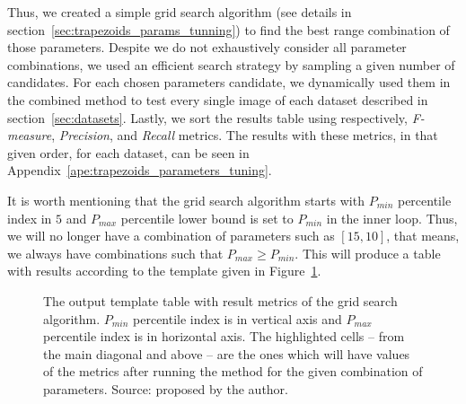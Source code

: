 Thus, we created a simple grid search algorithm (see details in section~\ref{sec:trapezoids_params_tunning}) to find the best range combination of those parameters. Despite we do not exhaustively consider all parameter combinations, we used an efficient search strategy by sampling a given number of candidates. For each chosen parameters candidate, we dynamically used them in the combined method to test every single image of each dataset described in section~\ref{sec:datasets}. Lastly, we sort the results table using respectively, \emph{F-measure}, \emph{Precision}, and \emph{Recall} metrics. The results with these metrics, in that given order, for each dataset, can be seen in Appendix~\ref{ape:trapezoids_parameters_tuning}.

It is worth mentioning that the grid search algorithm starts with $P_{min}$ percentile index in $5$ and $P_{max}$ percentile lower bound is set to $P_{min}$ in the inner loop. Thus, we will no longer have a combination of parameters such as $[15, 10]$, that means, we always have combinations such that $P_{max} \geq P_{min}$. This will produce a table with results according to the template given in Figure~\ref{fig:gs_table_output}.

\begin{figure}[ht]
    \centering

    \caption[The output template table with result metrics of the grid search algorithm]{The output template table with result metrics of the grid search algorithm. $P_{min}$ percentile index is in vertical axis and $P_{max}$ percentile index is in horizontal axis. The highlighted cells -- from the main diagonal and above -- are the ones which will have values of the metrics after running the method for the given combination of parameters. Source: proposed by the author.}
    \label{fig:gs_table_output}
\end{figure}

